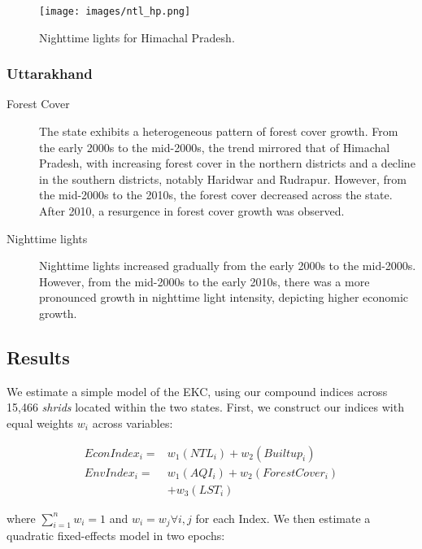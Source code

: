 \documentclass[doublespace,times,Afour,review]{template/sagej}
\begin{document}
\begin{figure}[h]
    \setlength{\fboxsep}{0pt}%
    \setlength{\fboxrule}{0pt}%
    \begin{center}
    \texttt{[image: images/ntl\_hp.png]}
    \caption{Nighttime lights for Himachal Pradesh.}
    \end{center}
\end{figure}

\subsubsection*{Uttarakhand}

\begin{description}
    \item[Forest Cover] The state exhibits a heterogeneous pattern of forest cover growth. From the early 2000s to the mid-2000s, the trend mirrored that of Himachal Pradesh, with increasing forest cover in the northern districts and a decline in the southern districts, notably Haridwar and Rudrapur. However, from the mid-2000s to the 2010s, the forest cover decreased across the state. After 2010, a resurgence in forest cover growth was observed.
    \item[Nighttime lights] Nighttime lights increased gradually from the early 2000s to the mid-2000s. However, from the mid-2000s to the early 2010s, there was a more pronounced growth in nighttime light intensity, depicting higher economic growth.

\end{description}

\subsection{Results}

We estimate a simple model of the EKC, using our compound indices across 15,466 \textit{shrids} located within the two states. First, we construct our indices with equal weights $w_i$ across variables:

\begin{align*}
    EconIndex_i = & w_1(NTL_i) + w_2(Builtup_i) \\
    EnvIndex_i = & w_1(AQI_i) + w_2(ForestCover_i) \\
                 &+ w_3(LST_i)
\end{align*}

where $\sum_{i=1}^{n}w_i = 1$ and $w_i = w_j \forall i, j$ for each Index. We then estimate a quadratic fixed-effects model in two epochs:
\end{document}
